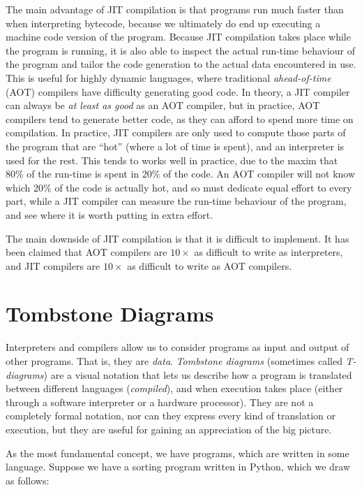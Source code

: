 The main advantage of JIT compilation is that programs run much faster
than when interpreting bytecode, because we ultimately do end up
executing a machine code version of the program.  Because JIT
compilation takes place while the program is running, it is also able
to inspect the actual run-time behaviour of the program and tailor the
code generation to the actual data encountered in use.  This is useful
for highly dynamic languages, where traditional \textit{ahead-of-time}
(AOT) compilers have difficulty generating good code.  In theory, a
JIT compiler can always be \textit{at least as good} as an AOT
compiler, but in practice, AOT compilers tend to generate better code,
as they can afford to spend more time on compilation.  In practice,
JIT compilers are only used to compute those parts of the program that
are ``hot'' (where a lot of time is spent), and an interpreter is used
for the rest.  This tends to works well in practice, due to the maxim
that 80\% of the run-time is spent in 20\% of the code.  An AOT
compiler will not know which 20\% of the code is actually hot, and so
must dedicate equal effort to every part, while a JIT compiler can
measure the run-time behaviour of the program, and see where it is
worth putting in extra effort.

The main downside of JIT compilation is that it is difficult to
implement.  It has been claimed that AOT compilers are $10\times$ as
difficult to write as interpreters, and JIT compilers are $10\times$
as difficult to write as AOT compilers.

\section{Tombstone Diagrams}



Interpreters and compilers allow us to consider programs as input and
output of other programs.  That is, they are \textit{data}.
\textit{Tombstone diagrams} (sometimes called \textit{T-diagrams}) are
a visual notation that lets us describe how a program is translated
between different languages (\textit{compiled}), and when execution
takes place (either through a software interpreter or a hardware
processor).  They are not a completely formal notation, nor can they
express every kind of translation or execution, but they are useful
for gaining an appreciation of the big picture.

As the most fundamental concept, we have programs, which are written
in some language.  Suppose we have a sorting program written in
Python, which we draw as follows:

